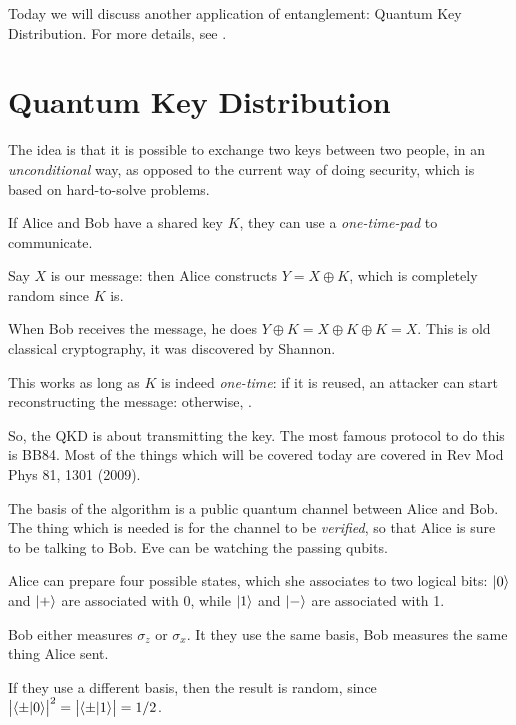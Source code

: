 \documentclass[main.tex]{subfiles}
\begin{document}

Today we will discuss another application of entanglement: Quantum Key Distribution.
For more details, see \cite[]{scaraniSecurityPracticalQuantum2009}.

\section{Quantum Key Distribution}

The idea is that it is possible to exchange two keys between two people, in an \emph{unconditional} way, as opposed to the current way of doing security, which is based on hard-to-solve problems. 

If Alice and Bob have a shared key \(K\), they can use a \emph{one-time-pad} to communicate. 

Say \(X\) is our message: then Alice constructs \(Y = X \oplus K\), which is completely random since \(K\) is. 

When Bob receives the message, he does \(Y \oplus K = X \oplus K \oplus K = X\). 
This is old classical cryptography, it was discovered by Shannon. 

This works as long as \(K\) is indeed \emph{one-time}: if it is reused, an attacker can start reconstructing the message: otherwise, . 

So, the QKD is about transmitting the key. 
The most famous protocol to do this is BB84. 
Most of the things which will be covered today are covered in 
Rev Mod Phys 81, 1301 (2009).

The basis of the algorithm is a public quantum channel between Alice and Bob. The thing which is needed is for the channel to be \emph{verified}, so that Alice is sure to be talking to Bob. 
Eve can be watching the passing qubits.  

Alice can prepare four possible states, which she associates to two logical bits: \(\ket{0}\) and \(\ket{+}\) are associated with 0, while \(\ket{1}\) and \(\ket{-}\) are associated with 1. 

Bob either measures \(\sigma_{z}\) or \(\sigma_{x}\). 
It they use the same basis, Bob measures the same thing Alice sent. 

If they use a different basis, then the result is random, since \(\abs{\braket{\pm}{0}}^2 =  \abs{\braket{\pm}{1}}= 1 / 2\). 
\end{document}
